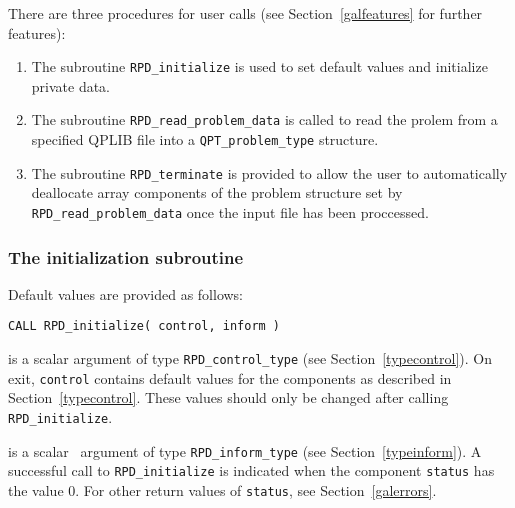 \documentclass{galahad}
\newcommand{\packagename}{RPD}
\begin{document}
\begin{description}
\begin{description}
\end{description}


\galarguments
There are three procedures for user calls
(see Section~\ref{galfeatures} for further features):

\begin{enumerate}
\item The subroutine
      {\tt \packagename\_initialize}
      is used to set default values and initialize private data.
\item The subroutine
      {\tt \packagename\_read\_problem\_data}
      is called to read the prolem from a specified
      QPLIB file into a {\tt QPT\_problem\_type} structure.
\item The subroutine
      {\tt \packagename\_terminate}
      is provided to allow the user to automatically deallocate array
       components of the problem structure set by
       {\tt \packagename\_read\_problem\_data} once
       the input file has been proccessed.
\end{enumerate}


\subsubsection{The initialization subroutine}\label{subinit}
 Default values are provided as follows:

\hskip0.5in
{\tt CALL \packagename\_initialize( control, inform )}

\begin{description}

 is a scalar \intentout argument of type
{\tt \packagename\_control\_type}
(see Section~\ref{typecontrol}).
On exit, {\tt control} contains default values for the components as
described in Section~\ref{typecontrol}.
These values should only be changed after calling
{\tt \packagename\_initialize}.

 is a scalar \intentout\ argument of type
{\tt \packagename\_inform\_type}
(see Section~\ref{typeinform}). A successful call to
{\tt \packagename\_initialize}
is indicated when the  component {\tt status} has the value 0.
For other return values of {\tt status}, see Section~\ref{galerrors}.

\end{description}



\end{description}
\end{document}
